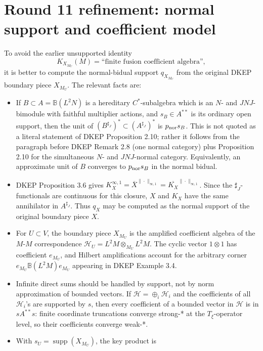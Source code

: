 \documentclass{article}
\begin{document}
\section*{Round 11 refinement: normal support and coefficient model}

To avoid the earlier unsupported identity
\[
  K_{X_{M_U}}(M)=\text{``finite fusion coefficient algebra''},
\]
it is better to compute the normal-bidual support \(q_{X_{M_U}}\) from the
original DKEP boundary piece \(X_{M_U}\).  The relevant facts are:

\begin{itemize}
\item If \(B\subset A=\mathbb B(L^2N)\) is a hereditary \(C^*\)-subalgebra
which is an \(N\)- and \(JNJ\)-bimodule with faithful multiplier actions, and
\(s_B\in A^{**}\) is its ordinary open support, then the unit of
\((B^{\sharp_J})^*\subset (A^{\sharp_J})^*\) is \(p_{\rm nor}s_B\).  This is
not quoted as a literal statement of DKEP Proposition 2.10; rather it follows
from the paragraph before DKEP Remark 2.8 (one normal category) plus Proposition
2.10 for the simultaneous \(N\)- and \(JNJ\)-normal category.  Equivalently, an
approximate unit of \(B\) converges to \(p_{\rm nor}s_B\) in the normal bidual.
\item DKEP Proposition 3.6 gives
\(K_X^{\infty,1}=\overline{X}^{\|\cdot\|_{\infty,1}}
=\overline{K_X}^{\|\cdot\|_{\infty,1}}\).  Since the \(\sharp_J\)-functionals
are continuous for this closure, \(X\) and \(K_X\) have the same annihilator in
\(A^{\sharp_J}\).  Thus \(q_X\) may be computed as the normal support of the
original boundary piece \(X\).
\item For \(U\subset V\), the boundary piece \(X_{M_U}\) is the amplified
coefficient algebra of the \(M\)-\(M\) correspondence
\(\mathcal H_U=L^2M\otimes_{M_U}L^2M\).  The cyclic vector \(1\otimes1\) has
coefficient \(e_{M_U}\), and Hilbert amplifications account for the arbitrary
corner \(e_{M_U}\mathbb B(L^2M)e_{M_U}\) appearing in DKEP Example 3.4.
\item Infinite direct sums should be handled by support, not by norm
approximation of bounded vectors.  If \(\mathcal H=\oplus_i\mathcal H_i\) and
the coefficients of all \(\mathcal H_i\)'s are supported by \(s\), then every
coefficient of a bounded vector in \(\mathcal H\) is in \(sA^{**}s\): finite
coordinate truncations converge strong-* at the \(T_\xi\)-operator level, so
their coefficients converge weak-*.
\item With \(s_U=\operatorname{supp}(X_{M_U})\), the key product is

\end{itemize}
\end{document}
